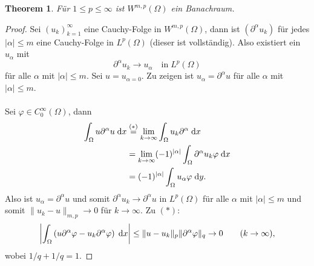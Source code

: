 \documentclass[
paper=a4,
bibtotocnumbered,
liststotocnumbered,
tablecaptionabove,
pointlessnumbers,
twoside,
openright,
10pt
]
{report}
\let\phi\varphi
\newtheorem{thm}{Theorem}[chapter]
\theoremstyle{definition}
\numberwithin{equation}{chapter}
\begin{document}
\begin{thm}\label{thm2_1}
Für $1\leq p\leq\infty$ ist $W^{m,p}(\Omega)$ ein Banachraum.
\end{thm}

\begin{proof}
Sei $(u_k)_{k=1}^\infty$ eine Cauchy-Folge in $W^{m,p}(\Omega)$, dann ist $(\partial^\alpha u_k)$ für jedes $|\alpha|\leq m$ eine Cauchy-Folge in $L^p(\Omega)$ (dieser ist vollständig). Also existiert ein $u_\alpha$ mit
\begin{equation}
\partial^\alpha u_k \rightarrow u_\alpha\quad\mathrm{in}\; L^p(\Omega)
\end{equation}
für alle $\alpha$ mit $|\alpha|\leq m$. Sei $u=u_{\alpha =0}$. Zu zeigen ist $u_\alpha=\partial^\alpha u$ für alle $\alpha$ mit $|\alpha|\leq m$. \\\\
Sei $\phi\in C_0^\infty(\Omega)$, dann
\begin{align}
\int_\Omega u\partial^\alpha u\d x 
&\overset{(\ast)}{=} \lim\limits_{k\rightarrow\infty} \int_\Omega u_k\partial^\alpha\d x \\
&= \lim\limits_{k\rightarrow\infty} (-1)^{|\alpha|}\int_\Omega \partial^\alpha u_k\phi\d x \\
&= (-1)^{|\alpha|} \int_\Omega u_\alpha\phi \d y .
\end{align}
Also ist $u_\alpha =\partial^\alpha u$ und somit $\partial^\alpha u_k\rightarrow\partial^\alpha u$ in $L^p(\Omega)$ für alle $\alpha$ mit $|\alpha|\leq m$ und somit $\|u_k-u\|_{m,p}\rightarrow 0$ für $k\rightarrow\infty$.
Zu $(\ast)$:
\begin{align}
\left| \int_\Omega\left( u\partial^\alpha\phi-u_k\partial^\alpha\phi \right)\d x \right| 
\leq \|u-u_k\|_p \|\partial^\alpha \phi\|_q\rightarrow 0 \qquad (k\rightarrow\infty),
\end{align}
wobei $1/q+1/q=1$.
\end{proof}
\end{document}

